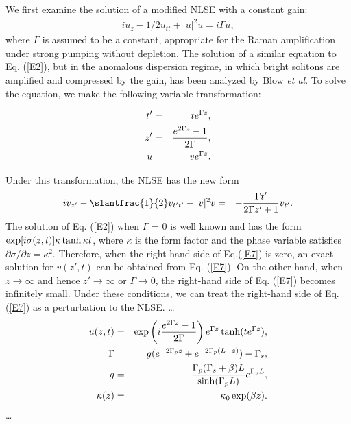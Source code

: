 We first examine the solution of a modified NLSE with a constant gain:
\begin{eqnarray}
i u_{z} - {1/2} u_{tt} + |u|^2 u  =  i \Gamma u,
\label{E2}
\end{eqnarray}
where $\Gamma $ is assumed to be a constant, appropriate for the Raman
amplification under strong pumping without depletion.  The solution of a
similar equation to Eq. (\ref{E2}), but in the anomalous dispersion regime,
in which bright solitons are amplified and compressed by the gain, has been
analyzed by Blow {\it et al}.\cite{BA} To solve the equation,  we make the
following variable transformation:
\begin{mathletters}
\begin{eqnarray}
t'  &=&  t e^{ \Gamma z }, \label{E4}  \\
z'  &=&  { e^{2 \Gamma z } - 1 \over  2 \Gamma },  \label{E5}  \\
u   &=&  v e^{ \Gamma z } .                          \label{E6}
\end{eqnarray}
\end{mathletters}
Under this transformation,  the NLSE has the new form
\begin{eqnarray}
i v_{z'} -\slantfrac{1}{2} v_{ t' t' } - |v|^2 v  &=&
- { \Gamma t' \over 2 \Gamma z' + 1} v_{t'}. \label{E7}
\end{eqnarray}
The solution of Eq. (\ref{E2}) when $\Gamma $ = 0 is well known and has the
form ${\rm exp} [i \sigma (z,t) ] \kappa \tanh \kappa t $, where $\kappa $
is the form factor and the phase variable satisfies $ \partial \sigma /
\partial z  =  \kappa^2 $.\cite{ZA} Therefore, when the right-hand-side of
Eq.(\ref{E7}) is zero, an exact solution for $v(z',t)$ can be obtained from
Eq. (\ref{E7}). On the other hand, when $z \rightarrow \infty $ and hence
$z' \rightarrow \infty $ or $ \Gamma \rightarrow 0$,  the right-hand side
of Eq. (\ref{E7}) becomes infinitely small. Under these conditions, we can
treat the right-hand side of Eq. (\ref{E7}) as a perturbation to the NLSE.
\ldots
\begin{eqnarray}
u(z,t)&=&{\rm exp}\left( i{e^{2\Gamma z}-1 \over 2\Gamma}\right)
e^{\Gamma z} \, {\rm tanh} (te^{\Gamma z}),
\label{E8}                                \\
\Gamma&=&g(e^{-2\Gamma_pz} + e^{-2\Gamma_p(L-z)}) - \Gamma_s,
\label{E9} \\
g&=&{\Gamma_p(\Gamma_s + \beta)L \over {\rm sinh}(\Gamma_pL)}
e^{\Gamma_pL} , \label{E10} \\
\kappa(z) &=& \kappa_0 \, {\rm exp}(\beta z). \label{E11}
\end{eqnarray}
\ldots

